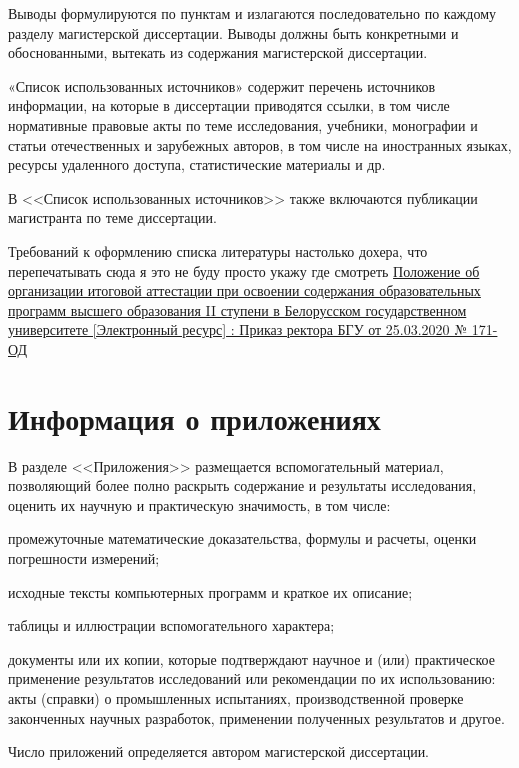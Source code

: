 \documentclass{mpaper}
\begin{document}
    Выводы формулируются по пунктам и излагаются последовательно по каждому разделу магистерской диссертации. Выводы должны быть конкретными и обоснованными, вытекать из содержания магистерской диссертации.

    «Список использованных источников» содержит перечень источников информации, на которые в диссертации приводятся ссылки, в том числе нормативные правовые акты по теме исследования, учебники, монографии и статьи отечественных и зарубежных авторов, в том числе на иностранных языках, ресурсы удаленного доступа, статистические материалы и др.

    В <<Список использованных источников>> также включаются публикации магистранта по теме диссертации.
    \begin{thebibliography}{9}
         Требований к оформлению списка литературы настолько дохера, что перепечатывать сюда я это не буду просто укажу где смотреть
         \href{https://rci.bsu.by/images/docs/prikaz_polozhenie_ob_attestatsi_magistratura_2020.pdf}{Положение об организации итоговой аттестации при освоении содержания образовательных программ высшего образования II ступени в Белорусском государственном университете [Электронный ресурс] : Приказ ректора БГУ от 25.03.2020 № 171-ОД}
    \end{thebibliography}
    \appendix
    \chapter{Информация о приложениях}
    В разделе <<Приложения>> размещается вспомогательный материал, позволяющий более полно раскрыть содержание и результаты исследования, оценить их научную и практическую значимость, в том числе:

    промежуточные математические доказательства, формулы и расчеты, оценки погрешности измерений;

    исходные тексты компьютерных программ и краткое их описание;

    таблицы и иллюстрации вспомогательного характера;

    документы или их копии, которые подтверждают научное и (или) практическое применение результатов исследований или рекомендации по их использованию: акты (справки) о промышленных испытаниях, производственной проверке законченных научных разработок, применении полученных результатов и другое.

    Число приложений определяется автором магистерской диссертации.
\end{document}
